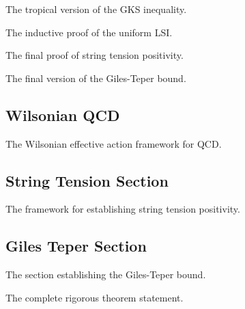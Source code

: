 \begin{theorem}
\label{thm:tropical-gks}
The tropical version of the GKS inequality.
\end{theorem}

\begin{theorem}
\label{thm:uniform-lsi-induction}
The inductive proof of the uniform LSI.
\end{theorem}

\begin{theorem}
\label{thm:sigma-positivity-final}
The final proof of string tension positivity.
\end{theorem}

\begin{theorem}
\label{thm:giles-teper-final}
The final version of the Giles-Teper bound.
\end{theorem}

\subsection{Wilsonian QCD}
\label{sec:wilsonian-qcd}

\begin{theorem}
The Wilsonian effective action framework for QCD.
\end{theorem}

\subsection{String Tension Section}
\label{sec:string-tension}

\begin{theorem}
The framework for establishing string tension positivity.
\end{theorem}

\subsection{Giles Teper Section}
\label{sec:giles-teper}

\begin{theorem}
The section establishing the Giles-Teper bound.
\end{theorem}

\begin{theorem}
\label{thm:complete-rigorous}
The complete rigorous theorem statement.
\end{theorem}

